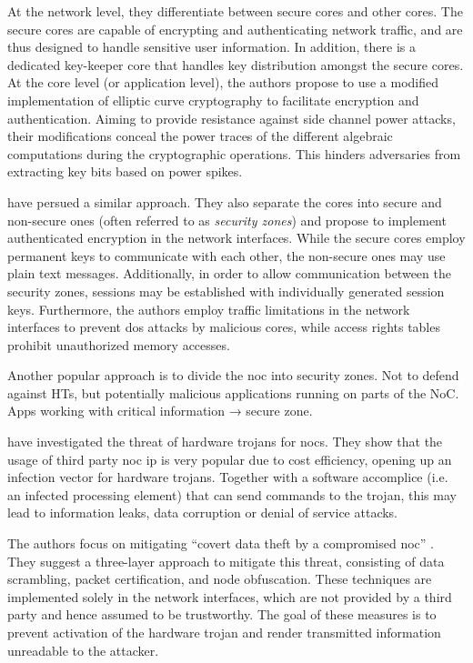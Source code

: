 At the network level, they differentiate between secure cores and other cores. The secure cores are capable of encrypting and authenticating network
traffic, and are thus designed to handle sensitive user information. In addition, there is a dedicated key-keeper core that handles key distribution
amongst the secure cores. At the core level (or application level), the authors propose to use a modified implementation of elliptic curve
cryptography to facilitate encryption and authentication. Aiming to provide resistance against side channel power attacks, their modifications conceal
the power traces of the different algebraic computations during the cryptographic operations. This hinders adversaries from extracting key bits based
on power spikes.

\citeauthor{kapoor13nocauthenc} \cite{kapoor13nocauthenc} have persued a similar approach. They also separate the cores into secure and non-secure
ones (often referred to as \textit{security zones}) and propose to implement authenticated encryption in the network interfaces. While the secure
cores employ permanent keys to communicate with each other, the non-secure ones may use plain text messages. Additionally, in order to allow
communication between the security zones, sessions may be established with individually generated session keys. Furthermore, the authors employ
traffic limitations in the network interfaces to prevent \gls{dos} attacks by malicious cores, while access rights tables prohibit unauthorized
memory accesses.

Another popular approach is to divide the \gls{noc} into security zones. Not to defend against HTs, but potentially malicious applications running on
parts of the NoC. Apps working with critical information → secure zone.

\citeauthor{ancajas14fortnocs} \cite{ancajas14fortnocs} have investigated the threat of hardware trojans for \glspl{noc}. They show that the usage of
third party \gls{noc} \gls{ip} is very popular due to cost efficiency, opening up an infection vector for hardware
trojans. Together with a software accomplice (i.e. an infected processing element) that can send commands to the trojan, this may
lead to information leaks, data corruption or denial of service attacks.

The authors focus on mitigating \enquote{covert data theft by a compromised \gls{noc}} \cite[3]{ancajas14fortnocs}. They suggest a three-layer
approach to mitigate this threat, consisting of data scrambling, packet certification, and node obfuscation. These techniques are
implemented solely in the network interfaces, which are not provided by a third party and hence assumed to be trustworthy. The goal of these measures
is to prevent activation of the hardware trojan and render transmitted information unreadable to the attacker.

